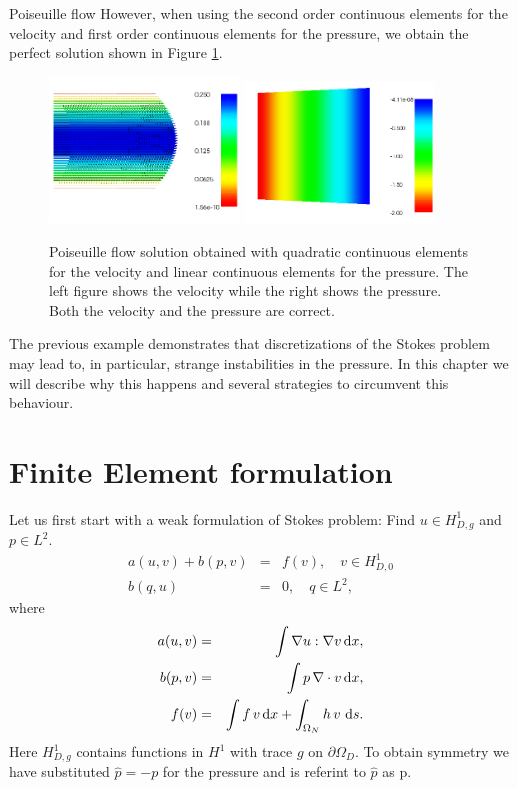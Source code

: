\begin{example}{Poiseuille flow}
However, when using the second order continuous elements for the velocity and
first order continuous elements for the pressure, we obtain the perfect solution
shown in Figure \ref{fig:stokes2}.
\begin{figure}
\begin{center}
\includegraphics[width=0.45\textwidth]{chapters/Stokes_problem/plots/stokes_velocity.png}
\includegraphics[width=0.45\textwidth]{chapters/Stokes_problem/plots/stokes_pressure.png}
\caption{Poiseuille flow solution obtained with quadratic continuous elements for the
velocity and linear continuous elements for the pressure. The left figure shows the velocity while the right shows
the pressure. Both the velocity and the pressure are correct.}
\label{fig:stokes2}
\end{center}
\end{figure}
\end{example}

The previous example demonstrates that discretizations of the Stokes problem may lead
to, in particular, strange instabilities in the pressure. In this chapter we will describe why this
happens and several strategies to circumvent this behaviour.

\section{Finite Element formulation}

Let us first start with a weak formulation of Stokes problem:
Find $u\in H^1_{D,g}$ and $p\in L^2$.
\begin{eqnarray*}
a(u,v) + b(p,v) &=& f(v), \quad v\in H_{D,0}^1\\
b(q,u) &=& 0,\quad q\in L^2,
\end{eqnarray*}
where
\begin{eqnarray*}
a(u,v) &=& \int\nabla u : \nabla v \, \mathrm{d}x, \\
b(p,v) &=& \int p \, \nabla \cdot v \, \mathrm{d}x, \\
f(v) &=& \int f\, v \, \mathrm{d}x + \int_{\Omega_N} h \, v \, \, \mathrm{d}s  .
\end{eqnarray*}
Here
$H^1_{D,g}$ contains functions  in $H^1$ with trace $g$ on $\partial \Omega_D$.
To obtain symmetry we have substituted $\hat{p} = - p$ for the pressure
and is referint to $\hat{p}$ as p.

